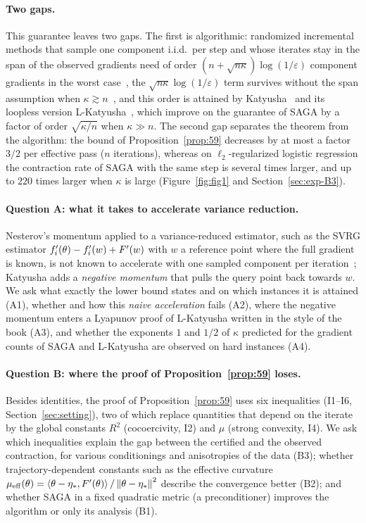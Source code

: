 \paragraph{Two gaps.}
This guarantee leaves two gaps. The first is algorithmic: randomized incremental methods that sample one component
i.i.d.\ per step and whose iterates stay in the span of the observed gradients need of order
$(n+\sqrt{n\kappa})\log(1/\varepsilon)$ component gradients in the worst case~\cite{lan2018optimal}, the
$\sqrt{n\kappa}\log(1/\varepsilon)$ term survives without the span assumption when $\kappa\gtrsim
n$~\cite{woodworth2016tight}, and this order is attained by Katyusha~\cite{allenzhu2018katyusha}
and its loopless version L-Katyusha~\cite{kovalev2020dont}, which improve on the guarantee of SAGA by a factor of
order $\sqrt{\kappa/n}$ when $\kappa\gg n$. The second gap separates the theorem from the algorithm: the bound of
Proposition~\ref{prop:59} decreases by at most a factor $3/2$ per effective pass ($n$ iterations), whereas on
$\ell_2$-regularized logistic regression the contraction rate of SAGA with the same step is several times larger, and
up to $220$ times larger when $\kappa$ is large (Figure~\ref{fig:fig1} and Section~\ref{sec:exp-B3}).

\paragraph{Question A: what it takes to accelerate variance reduction.}
Nesterov's momentum applied to a variance-reduced estimator, such as the SVRG estimator $f'_i(\theta)-f'_i(w)+F'(w)$
with $w$ a reference point where the full gradient is known, is not known to accelerate with one sampled component
per iteration~\cite{nitanda2014stochastic,allenzhu2018katyusha}; Katyusha adds a \emph{negative momentum} that pulls
the query point back towards $w$. We ask what exactly the lower bound states and on which instances it is attained
(A1), whether and how this \emph{naive acceleration} fails (A2), where the negative momentum enters a Lyapunov proof
of L-Katyusha written in the style of the book (A3), and whether the exponents $1$ and $1/2$ of $\kappa$ predicted
for the gradient counts of SAGA and L-Katyusha are observed on hard instances (A4).

\paragraph{Question B: where the proof of Proposition~\ref{prop:59} loses.}
Besides identities, the proof of Proposition~\ref{prop:59} uses six inequalities (I1--I6, Section~\ref{sec:setting}), two of
which replace quantities that depend on the iterate by the global constants $R^2$ (cocoercivity, I2) and $\mu$
(strong convexity, I4). We ask which inequalities explain the gap between the certified and the observed
contraction, for various conditionings and anisotropies of the data (B3); whether trajectory-dependent
constants such as the effective curvature $\mu_{\mathrm{eff}}(\theta)=\left\langle \theta-\eta_\ast, F'(\theta) \right\rangle/\left\|\theta-\eta_\ast\right\|^2$
describe the convergence better (B2); and whether SAGA in a fixed quadratic metric (a preconditioner) improves the
algorithm or only its analysis (B1).

